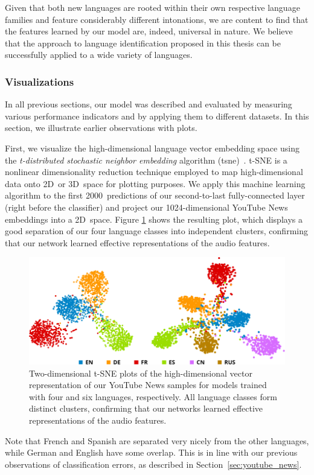 Given that both new languages are rooted within their own respective language families and feature considerably different intonations, we are content to find that the features learned by our model are, indeed, universal in nature. We believe that the approach to language identification proposed in this thesis can be successfully applied to a wide variety of languages.

\subsubsection{Visualizations}
\label{sec:visualization}
In all previous sections, our model was described and evaluated by measuring various performance indicators and by applying them to different datasets. In this section, we illustrate earlier observations with plots.

First, we visualize the high-dimensional language vector embedding space using the \emph{t-distributed stochastic neighbor embedding} algorithm (\ac{tsne})~\cite{maaten2008visualizing}. t-SNE is a nonlinear dimensionality reduction technique employed to map high-dimensional data onto 2D~or 3D~space for plotting purposes. We apply this machine learning algorithm to the first \num{2000}~predictions of our second-to-last fully-connected layer (right before the classifier) and project our \num{1024}-dimensional YouTube News embeddings into a 2D~space. Figure \ref{fig:tsne} shows the resulting plot, which displays a good separation of our four language classes into independent clusters, confirming that our network learned effective representations of the audio features.
%
	\begin{figure}[tp]
	\centering
	\includegraphics{plots/tsne-both.pdf}
	\caption{Two-dimensional t-SNE plots of the high-dimensional vector representation of our YouTube News samples for models trained with four and six languages,  respectively. All language classes form distinct clusters, confirming that our networks learned effective representations of the audio features.}
	\label{fig:tsne}
	\end{figure}
%
Note that French and Spanish are separated very nicely from the other languages, while German and English have some overlap. This is in line with our previous observations of classification errors, as described in Section~\ref{sec:youtube_news}.

